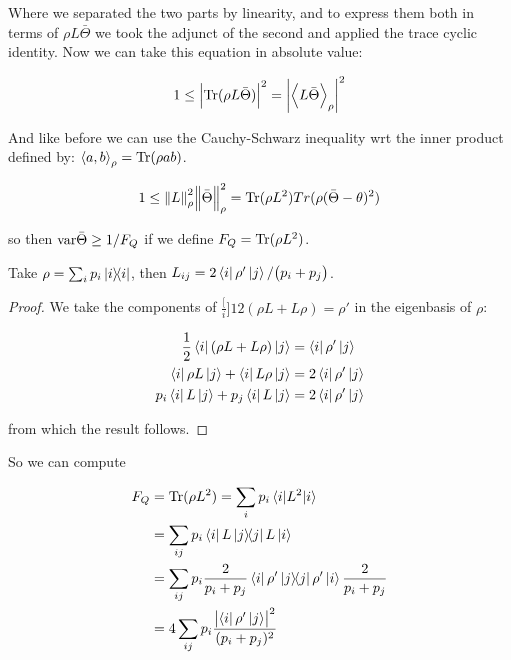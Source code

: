 \documentclass[main.tex]{subfiles}
\begin{document}
Where we separated the two parts by linearity, and to express them both in terms of \(\rho L \bar\Theta\) we took the adjunct of the second and applied the trace cyclic identity.
Now we can take this equation in absolute value:

\begin{equation}
  1 \leq \abs{\operatorname*{Tr} (\rho L \bar{\Theta})}^{2} = \abs{\expval{L \bar\Theta}_{\rho} }^{2}
\end{equation}

And like before we can use the Cauchy-Schwarz inequality wrt the inner product defined by: \(\expval{a, b}_\rho = \operatorname*{Tr} (\rho ab) \).

\begin{equation}
  1 \leq \norm{L}^{2} _{\rho}  \norm{\bar{\Theta}}^{2} _{\rho}
  = \operatorname*{Tr} (\rho L^2 ) Tr(\rho (\bar\Theta - \theta)^2)
\end{equation}

so then \( \text{var}{\bar\Theta} \geq 1/F_Q \) if we define \(F_Q = \operatorname*{Tr} (\rho L^2)\).

\begin{claim}
Take \( \rho = \sum_i p_i \ketbra{i} \), then \( L _{ij} = 2\bra{i}\rho' \ket{j}/\qty(p_i + p_j) \).
\end{claim}

\begin{bluebox}
  \begin{proof}
      We take the components of \(\frac[i]{1}{2} (\rho L + L \rho) = \rho' \) in the eigenbasis of \(\rho\):

      \begin{subequations}
      \begin{align}
        \frac{1}{2} \bra{i} \qty(\rho L + L \rho) \ket{j}  &= \bra{i} \rho' \ket{j}  \\
         \bra{i} \rho L \ket{j} + \bra{i} L \rho \ket{j} &= 2  \bra{i} \rho' \ket{j} \\
         p_i \bra{i} L \ket{j} + p_j \bra{i} L \ket{j} &= 2  \bra{i} \rho' \ket{j}
      \end{align}
      \end{subequations}

      from which the result follows.
  \end{proof}
\end{bluebox}

So we can compute

\begin{align}
  F_Q &= \Tr(\rho L^2) = \sum_i p_i \ev{L^2}{i}  \\
  &= \sum _{ij} p_i \bra{i} L \ketbra{j} L \ket{i}  \\
  &= \sum _{ij} p_i \frac{2}{p_i + p_j} \bra{i} \rho' \ketbra{j} \rho' \ket{i} \frac{2}{p_i + p_j}  \\
  &= 4 \sum _{ij} p_i\frac{\abs{\bra{i} \rho' \ket{j}}^2 }{(p_i + p_j)^2}
\end{align}
\end{document}
